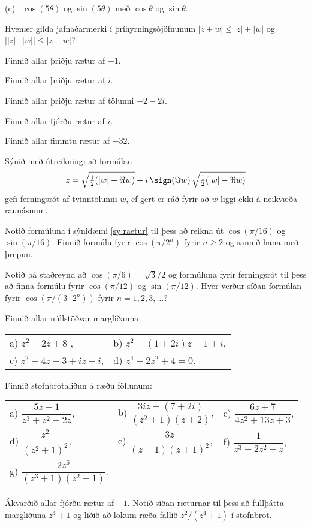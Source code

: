 \smallskip\noindent
(c) \ $\cos(5\theta)$  
og $\sin (5\theta)$ með  $\cos\theta$ og $\sin \theta$.



\daemi Hvenær gilda jafnaðarmerki í þríhyrningsójöfnunum  
$|z+w| \leq  |z| + |w|$
og $||z|-|w||\leq |z-w|$?


\daemi Finnið allar þriðju rætur af $-1$.

\daemi Finnið allar þriðju rætur af $i$.

\daemi Finnið allar þriðju rætur af tölunni $-2-2i$.

\daemi Finnið allar fjórðu rætur af $i$.

\daemi Finnið allar fimmtu rætur af $-32$.


\daemi Sýnið með útreikningi að formúlan
$$
z=\sqrt{\tfrac 12(|w|+\Re w)}+i\, \sign(\Im w)\, \sqrt{\tfrac
12(|w|-\Re w)}
$$
gefi ferningsrót af tvinntölunni $w$, ef gert er ráð fyrir að 
$w$ liggi ekki á neikvæða raunásnum.


\daemi Notið formúluna í sýnidæmi \ref{sy:raetur}
til þess að reikna út $\cos(\pi/16)$ og $\sin( \pi/16)$.
Finnið formúlu fyrir $\cos(\pi/2^n)$ fyrir $n\geq 2$ og sannið hana með
þrepun.

\daemi Notið þá staðreynd að $\cos(\pi/6)=\sqrt 3/2$ og formúluna fyrir ferningsrót
til þess að finna formúlu fyrir $\cos(\pi/12)$ og $\sin( \pi/12)$.
Hver verður síðan formúlan fyrir $\cos(\pi/(3\cdot 2^n))$ fyrir
$n=1,2,3,\dots$? 

\daemi Finnið allar núllstöðvar margliðanna 



\begin{tabular}{ll}
a) $z^2-2z+8$ ,
&b) $z^2-(1+2i)z-1+i$,\\
c) $z^2-4z+3+iz-i$,
&d) $z^4 - 2z^2 + 4=0$.\\ 
\end{tabular}


\daemi Finnið stofnbrotaliðun á ræðu föllunum:

\begin{tabular}{lll}
a) $\dfrac{5z+1}{z^3+z^2-2z}$, 
&b) $\dfrac{3iz+(7+2i)}{(z^2+1)(z+2)}$,
&c) $\dfrac{6z+7}{4z^2+13z+3}$,\\
d) $\dfrac{z^2}{(z^2+1)^2}$,
&e) $\dfrac {3z}{(z-1)(z+1)^2}$,
&f) $\dfrac{1}{z^3-2z^2+z}$,\\
g) $\dfrac{2z^6}{(z^3+1)(z^2-1)}$.\\
\end{tabular}

\daemi Ákvarðið allar fjórðu rætur af $-1$.  Notið síðan ræturnar til
þess að fullþátta  margliðuna $z^4+1$  og liðið að lokum
 ræða fallið $z^2/(z^4+1)$ í stofnbrot.


